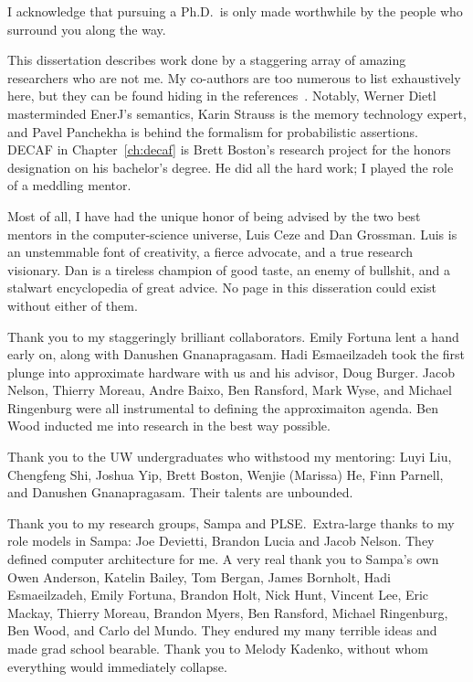 I acknowledge that pursuing a Ph.D.~is only made worthwhile by the people who
surround you along the way.

This dissertation describes work done by a staggering array of amazing
researchers who are not me.
My co-authors are too numerous to list exhaustively here, but they can be
found hiding in the references~\cite{enerj, decaf, passert, approxstorage}.
Notably, Werner Dietl masterminded EnerJ's semantics,
Karin Strauss is the memory technology expert, and
Pavel Panchekha is behind the formalism for probabilistic assertions.
DECAF in Chapter~\ref{ch:decaf} is Brett Boston's research
project for the honors designation on his bachelor's degree.
He did all the hard work; I played the role of a meddling mentor.

Most of all, I have had the unique honor of being advised by the two best
mentors in the computer-science universe, Luis Ceze and Dan Grossman.
Luis is an unstemmable font of creativity, a fierce advocate, and a true
research visionary.
Dan is a tireless champion of good taste, an enemy of bullshit, and a stalwart
encyclopedia of great advice.
No page in this disseration could exist without either of them.

Thank you to my staggeringly brilliant collaborators.
Emily Fortuna lent a hand early on, along with Danushen Gnanapragasam.
Hadi Esmaeilzadeh took the first plunge into approximate hardware with us and
his advisor, Doug Burger.
Jacob Nelson, Thierry Moreau, Andre Baixo, Ben Ransford, Mark Wyse, and
Michael Ringenburg were all instrumental to defining the approximaiton agenda.
Ben Wood inducted me into research in the best way possible.

Thank you to the UW undergraduates who withstood my mentoring:
Luyi Liu,
Chengfeng Shi,
Joshua Yip,
Brett Boston,
Wenjie (Marissa) He,
Finn Parnell, and
Danushen Gnanapragasam.
Their talents are unbounded.

Thank you to my research groups, Sampa and PLSE.\ Extra-large thanks to
my role models in Sampa: Joe Devietti, Brandon Lucia and Jacob Nelson.
They defined computer architecture for me.
A very real thank you to Sampa's own
Owen Anderson,
Katelin Bailey,
Tom Bergan,
James Bornholt,
Hadi Esmaeilzadeh,
Emily Fortuna,
Brandon Holt,
Nick Hunt,
Vincent Lee,
Eric Mackay,
Thierry Moreau,
Brandon Myers,
Ben Ransford,
Michael Ringenburg,
Ben Wood,
and
Carlo del Mundo.
They endured my many terrible ideas and made grad school bearable.
Thank you to Melody Kadenko, without whom everything would immediately
collapse.

